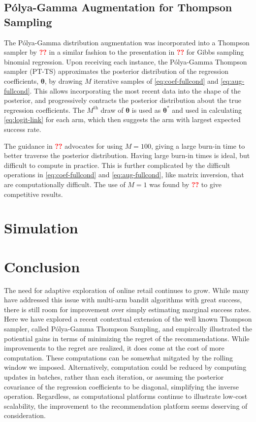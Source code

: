 \documentclass[12pt]{article}
\newcommand{\bred}[1]{\textbf{\textcolor{red}{#1}}}
\begin{document}
\subsection{P\'olya-Gamma Augmentation for Thompson Sampling}

The P\'olya-Gamma distribution augmentation was incorporated into a Thompson 
sampler by \bred{??} in a similar fashion to the presentation in \bred{??} for 
Gibbs sampling binomial regression. 
Upon receiving each instance, the P\'olya-Gamma Thompson sampler (PT-TS)
approximates the posterior distribution of the regression coefficients, 
$\bm{\theta}$, by drawing $M$ iterative samples of \eqref{eq:coef-fullcond} and
\eqref{eq:aug-fullcond}.
This allows incorporating the most recent data into the shape of the posterior,
and progressively contracts the posterior distribution about the true regression
coefficients.
The $M^{\text{th}}$ draw of $\bm{\theta}$ is used as $\bm{\theta}^*$ and used
in calculating \eqref{eq:logit-link} for each arm, which then suggests the arm 
with largest expected success rate.

The guidance in \bred{??} advocates for using $M = 100$, giving a large burn-in
time to better traverse the posterior distribution.
Having large burn-in times is ideal, but difficult to compute in practice.
This is further complicated by the difficult operations in \eqref{eq:coef-fullcond}
and \eqref{eq:aug-fullcond}, like matrix inversion, that are computationally 
difficult.
The use of $M = 1$ was found by \bred{??} to give competitive results.


\section{Simulation}


\section{Conclusion}

The need for adaptive exploration of online retail continues to grow.  
While many have addressed this issue with multi-arm bandit algorithms with great
success, there is still room for improvement over simply estimating marginal
success rates.
Here we have explored a recent contextual extension of the well known Thompson
sampler, called P\'olya-Gamma Thompson Sampling, and empircally illustrated the 
potiential gains in terms of minimizing the regret of the recommendations.
While improvements to the regret are realized, it does come at the cost of more
computation.
These computations can be somewhat mitgated by the rolling window we imposed.
Alternatively, computation could be reduced by computing updates in batches, 
rather than each iteration, or assuming the posterior covariance of the regression
coefficients to be diagonal, simplifying the inverse operation.
Regardless, as computational platforms continue to illustrate low-cost scalability,
the improvement to the recommendation platform seems deserving of consideration.
\end{document}
